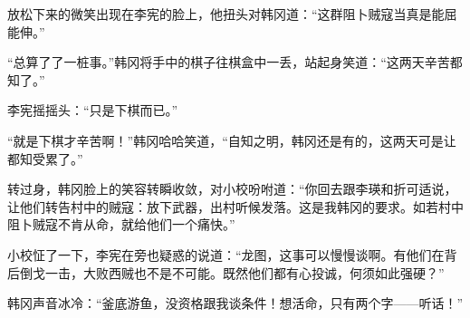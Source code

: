 放松下来的微笑出现在李宪的脸上，他扭头对韩冈道：“这群阻卜贼寇当真是能屈能伸。”

“总算了了一桩事。”韩冈将手中的棋子往棋盒中一丢，站起身笑道：“这两天辛苦都知了。”

李宪摇摇头：“只是下棋而已。”

“就是下棋才辛苦啊！”韩冈哈哈笑道，“自知之明，韩冈还是有的，这两天可是让都知受累了。”

转过身，韩冈脸上的笑容转瞬收敛，对小校吩咐道：“你回去跟李瑛和折可适说，让他们转告村中的贼寇：放下武器，出村听候发落。这是我韩冈的要求。如若村中阻卜贼寇不肯从命，就给他们一个痛快。”

小校怔了一下，李宪在旁也疑惑的说道：“龙图，这事可以慢慢谈啊。有他们在背后倒戈一击，大败西贼也不是不可能。既然他们都有心投诚，何须如此强硬？”

韩冈声音冰冷：“釜底游鱼，没资格跟我谈条件！想活命，只有两个字——听话！”

